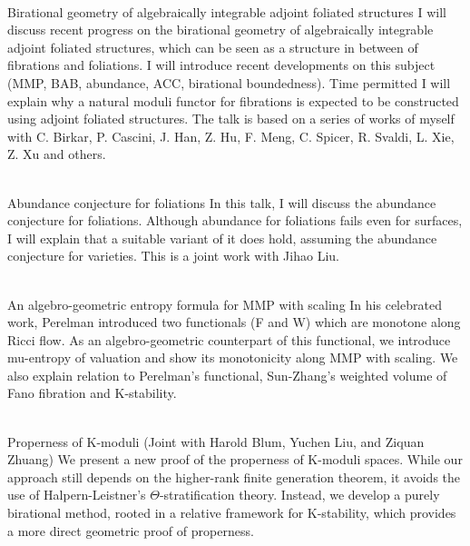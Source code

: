 \documentclass[dvipdfmx,a4paper,12pt]{article}
\theoremstyle{plain} %
\theoremstyle{definition} %
\begin{document}
\\
Birational geometry of algebraically integrable adjoint foliated structures
\vskip3mm
I will discuss recent progress on the birational geometry of algebraically integrable adjoint foliated structures, which can be seen as a structure in between of fibrations and foliations. I will introduce recent developments on this subject (MMP, BAB, abundance, ACC, birational boundedness). Time permitted I will explain why a natural moduli functor for fibrations is expected to be constructed using adjoint foliated structures. The talk is based on a series of works of myself with C. Birkar, P. Cascini, J. Han, Z. Hu, F. Meng, C. Spicer, R. Svaldi, L. Xie, Z. Xu and others.
\vskip8mm

\\
Abundance conjecture for foliations
\vskip3mm
In this talk, I will discuss the abundance conjecture for foliations. Although abundance for foliations fails even for surfaces, I will explain that a suitable variant of it does hold, assuming the abundance conjecture for varieties. This is a joint work with Jihao Liu.
\vskip8mm

\newpage
{}\\
An algebro-geometric entropy formula for MMP with scaling
\vskip3mm
In his celebrated work, Perelman introduced two functionals (F and W) which are monotone along Ricci flow. As an algebro-geometric counterpart of this functional, we introduce mu-entropy of valuation and show its monotonicity along MMP with scaling. We also explain relation to Perelman's functional, Sun-Zhang's weighted volume of Fano fibration and K-stability.
\vskip12mm


\vskip5mm
\\
Properness of K-moduli
\vskip3mm
(Joint with Harold Blum, Yuchen Liu, and Ziquan Zhuang)
We present a new proof of the properness of K-moduli spaces. While our approach still depends on the higher-rank finite generation theorem, it avoids the use of Halpern-Leistner's $\Theta$-stratification theory. Instead, we develop a purely birational method, rooted in a relative framework for K-stability, which provides a more direct geometric proof of properness.
\vskip8mm
\end{document}
